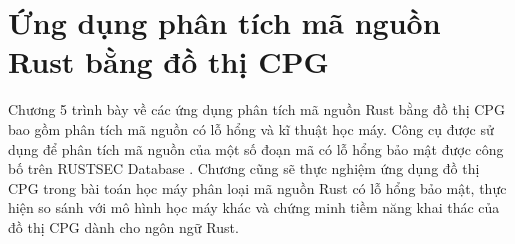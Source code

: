\chapter{Ứng dụng phân tích mã nguồn Rust bằng đồ thị CPG}
\label{chap:experiment}


Chương 5 trình bày về các ứng dụng phân tích mã nguồn Rust bằng đồ thị CPG bao gồm phân tích mã nguồn có lỗ hổng và kĩ thuật học máy.
Công cụ được sử dụng để phân tích mã nguồn của một số đoạn mã có lỗ hổng bảo mật được công bố trên RUSTSEC Database \cite{rustsecAboutRustSec}.
Chương cũng sẽ thực nghiệm ứng dụng đồ thị CPG trong bài toán học máy phân loại mã nguồn Rust có lỗ hổng bảo mật, thực hiện so sánh với mô hình học máy khác và chứng minh tiềm năng khai thác của đồ thị CPG dành cho ngôn ngữ Rust.

% 
% 
% 



